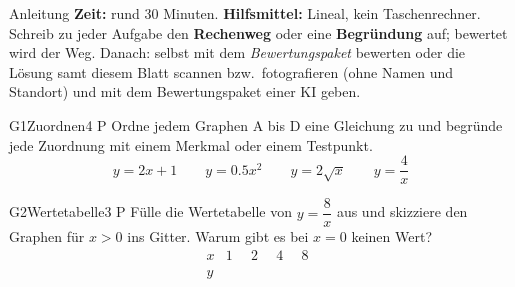 \documentclass[11pt]{article}
\begin{document}

\begin{lpinfo}{Anleitung}
\textbf{Zeit:} rund 30 Minuten. \textbf{Hilfsmittel:} Lineal, kein Taschenrechner.
Schreib zu jeder Aufgabe den \textbf{Rechenweg} oder eine \textbf{Begründung} auf; bewertet wird der Weg.
Danach: selbst mit dem \emph{Bewertungspaket} bewerten oder die Lösung samt diesem Blatt scannen bzw.\ fotografieren
(ohne Namen und Standort) und mit dem Bewertungspaket einer KI geben.
\end{lpinfo}


\begin{lpaufgabe}{G1}{Zuordnen}{4 P}
Ordne jedem Graphen A bis D eine Gleichung zu und begründe jede Zuordnung mit einem Merkmal oder einem Testpunkt.
\[ y = 2x + 1 \qquad y = 0.5x^2 \qquad y = 2\sqrt{x} \qquad y = \dfrac{4}{x} \]
\begin{center}
\hfill
{}\hfill
{}\hfill
{}
\end{center}
\end{lpaufgabe}

\begin{lpaufgabe}{G2}{Wertetabelle}{3 P}
Fülle die Wertetabelle von $y = \dfrac{8}{x}$ aus und skizziere den Graphen für $x > 0$ ins Gitter. Warum gibt es bei $x = 0$ keinen Wert?
\[ \begin{array}{c|cccc} x & 1 & 2 & 4 & 8 \\ \hline y & \phantom{00} & \phantom{00} & \phantom{00} & \phantom{00} \end{array} \]
\begin{center}\end{center}
\end{lpaufgabe}

\end{document}
